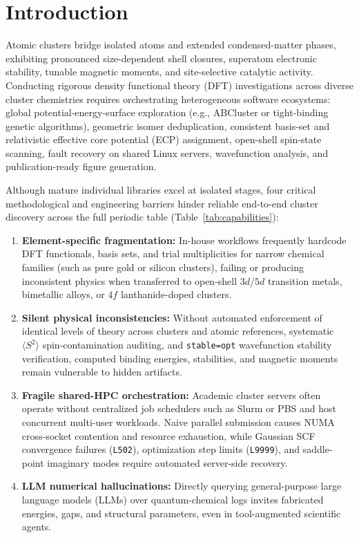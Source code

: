 \documentclass[journal=jcisd8,manuscript=article]{achemso}
\begin{document}
\section{Introduction}

Atomic clusters bridge isolated atoms and extended condensed-matter phases, exhibiting pronounced size-dependent shell closures, superatom electronic stability, tunable magnetic moments, and site-selective catalytic activity.\cite{pyykko2002wau12,li2002wau12,jian2019pes} Conducting rigorous density functional theory (DFT) investigations across diverse cluster chemistries requires orchestrating heterogeneous software ecosystems: global potential-energy-surface exploration (e.g., ABCluster\cite{zhang2015abcluster} or tight-binding genetic algorithms\cite{bannwarth2019gfn2xtb,larsen2017ase}), geometric isomer deduplication, consistent basis-set and relativistic effective core potential (ECP) assignment,\cite{weigend2005def2,pritchard2019bse,dolg2012ecp} open-shell spin-state scanning,\cite{cramer2009tm} fault recovery on shared Linux servers,\cite{ong2013pymatgen} wavefunction analysis,\cite{oboyle2008cclib,lu2012multiwfn} and publication-ready figure generation.\cite{humphrey1996vmd}

Although mature individual libraries excel at isolated stages, four critical methodological and engineering barriers hinder reliable end-to-end cluster discovery across the full periodic table (Table~\ref{tab:capabilities}):
\begin{enumerate}
  \item \textbf{Element-specific fragmentation:} In-house workflows frequently hardcode DFT functionals, basis sets, and trial multiplicities for narrow chemical families (such as pure gold or silicon clusters), failing or producing inconsistent physics when transferred to open-shell $3d$/$5d$ transition metals, bimetallic alloys, or $4f$ lanthanide-doped clusters.
  \item \textbf{Silent physical inconsistencies:} Without automated enforcement of identical levels of theory across clusters and atomic references, systematic $\langle S^2 \rangle$ spin-contamination auditing, and \texttt{stable=opt} wavefunction stability verification,\cite{bauernschmitt1996stability} computed binding energies, stabilities, and magnetic moments remain vulnerable to hidden artifacts.
  \item \textbf{Fragile shared-HPC orchestration:} Academic cluster servers often operate without centralized job schedulers such as Slurm or PBS and host concurrent multi-user workloads. Naive parallel submission causes NUMA cross-socket contention and resource exhaustion, while Gaussian SCF convergence failures (\texttt{L502}), optimization step limits (\texttt{L9999}), and saddle-point imaginary modes require automated server-side recovery.
  \item \textbf{LLM numerical hallucinations:} Directly querying general-purpose large language models (LLMs) over quantum-chemical logs invites fabricated energies, gaps, and structural parameters, even in tool-augmented scientific agents.\cite{bran2024chemcrow,boiko2023coscientist}
\end{enumerate}
\end{document}
